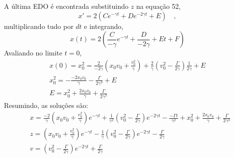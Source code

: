 \documentclass[12pt]{article}
\begin{document}
A última EDO é encontrada substituindo $z$ na equação 52, 
\begin{equation}
x' = 2\left(Ce^{-\gamma t} + De^{-2\gamma t} + E \right) \quad, 
\end{equation}
multiplicando tudo por $dt$ e integrando,
\begin{equation}
x(t) = 2\left( \frac{C}{-\gamma}e^{-\gamma t} + \frac{D}{-2\gamma} + E t + F\right)
\end{equation}
Avaliando no limite $t=0$,
\begin{equation}
\begin{split}
x(0) = x_0^2 = \frac{2}{-2\gamma}\left(x_0v_0 + \frac{v_0^2}{\gamma}\right) + \frac{2}{\gamma}\left(v_0^2 - \frac{\Gamma}{2\gamma} \right)\frac{1}{2\gamma} + E \\
x_0^2 = -\frac{-2x_0v_0}{\gamma} - \frac{\Gamma}{2\gamma^3} + E \\
E = x_0^2 + \frac{2x_0v_0}{\gamma} + \frac{\Gamma}{2\gamma^3}
\end{split}
\end{equation}
Resumindo, as soluções são:
\begin{align}
& x = \frac{-2}{\gamma}\left( x_0v_0 + \frac{v_0^2}{\gamma}\right)e^{-\gamma t} + \frac{1}{\gamma^2}\left(v_0^2 -\frac{\Gamma}{2\gamma}\right)e^{-2\gamma t} - \frac{-\Gamma t}{\gamma^2} + x_0^2 + \frac{2x_0v_0}{\gamma} + \frac{\Gamma}{2\gamma^3} \\
& z = \left(x_0v_0 + \frac{v_0^2}{\gamma}\right)e^{-\gamma t} - \frac{1}{\gamma}\left(v_0^2 - \frac{\Gamma}{2\gamma}\right)e^{-2\gamma t} - \frac{\Gamma}{2\gamma} \\
& v = \left(v_0^2 - \frac{\Gamma}{2\gamma}\right)e^{-2\gamma t} + \frac{\Gamma}{2\gamma} \\
\end{align}
\end{document}
